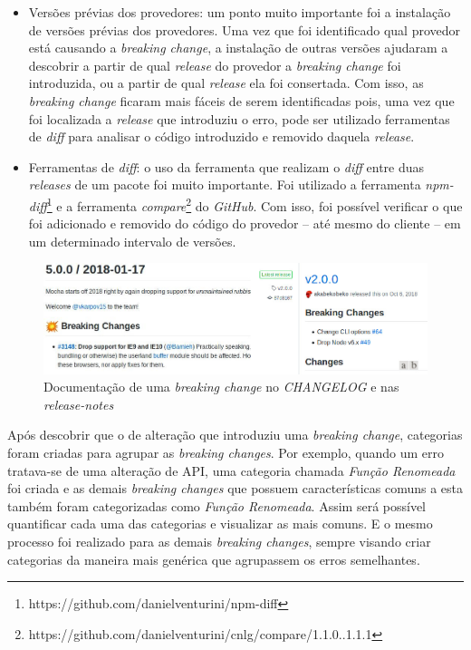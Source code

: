\begin{itemize}
    \item Versões prévias dos provedores: um ponto muito importante foi a instalação de versões prévias dos provedores. Uma vez que foi identificado qual provedor está causando a \textit{breaking change}, a instalação de outras versões ajudaram a descobrir a partir de qual \textit{release} do provedor a \textit{breaking change} foi introduzida, ou a partir de qual \textit{release} ela foi consertada. Com isso, as \textit{breaking change} ficaram mais fáceis de serem identificadas pois, uma vez que foi localizada a \textit{release} que introduziu o erro, pode ser utilizado ferramentas de \textit{diff} para analisar o código introduzido e removido daquela \textit{release}.

    \item Ferramentas de \textit{diff}: o uso da ferramenta que realizam o  \textit{diff} entre duas \textit{releases} de um pacote foi muito importante. Foi utilizado a ferramenta \textit{npm-diff}\footnote{https://github.com/danielventurini/npm-diff} e a ferramenta \textit{compare}\footnote{https://github.com/danielventurini/cnlg/compare/1.1.0..1.1.1} do \textit{GitHub}. Com isso, foi possível verificar o que foi adicionado e removido do código do provedor -- até mesmo do cliente -- em um determinado intervalo de versões.
\end{itemize}

\begin{figure}
    \centering
    \includegraphics[scale=0.45]{figuras/bc_documentation.jpeg}
    \caption{Documentação de uma \textit{breaking change} no \textit{CHANGELOG} e nas \textit{release-notes}}
    \label{fig:bc_documentation}
\end{figure}{}

Após descobrir que o de alteração que introduziu uma \textit{breaking change}, categorias foram criadas para agrupar as \textit{breaking changes}. Por exemplo, quando um erro tratava-se de uma alteração de \gls{API}, uma categoria chamada \textit{Função Renomeada} foi criada e as demais \textit{breaking changes} que possuem características comuns a esta também foram categorizadas como \textit{Função Renomeada}. Assim será possível quantificar cada uma das categorias e visualizar as mais comuns. E o mesmo processo foi realizado para as demais \textit{breaking changes}, sempre visando criar categorias da maneira mais genérica que agrupassem os erros semelhantes.

